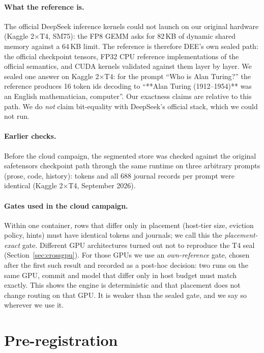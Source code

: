 \documentclass[11pt]{article}
\newcommand{\dee}{\textsc{DEE}}
\begin{document}
\paragraph{What the reference is.} The official DeepSeek inference kernels
could not launch on our original hardware (Kaggle 2$\times$T4, SM75): the FP8
GEMM asks for 82\,KB of dynamic shared memory against a 64\,KB limit. The
reference is therefore \dee{}'s own sealed path: the official checkpoint
tensors, FP32 CPU reference implementations of the official semantics, and CUDA
kernels validated against them layer by layer. We sealed one answer on Kaggle
2$\times$T4: for the prompt ``Who is Alan Turing?'' the reference produces 16
token ids decoding to ``**Alan Turing (1912--1954)** was an English
mathematician, computer''. Our exactness claims are relative to this path. We do
\emph{not} claim bit-equality with DeepSeek's official stack, which we could not
run.

\paragraph{Earlier checks.} Before the cloud campaign, the segmented store was
checked against the original safetensors checkpoint path through the same
runtime on three arbitrary prompts (prose, code, history): tokens and all 688
journal records per prompt were identical (Kaggle 2$\times$T4, September 2026).

\paragraph{Gates used in the cloud campaign.} Within one container, rows that
differ only in placement (host-tier size, eviction policy, hints) must have
identical tokens and journals; we call this the \emph{placement-exact} gate.
Different GPU architectures turned out not to reproduce the T4 seal
(Section~\ref{sec:crossgpu}). For those GPUs we use an
\emph{own-reference} gate, chosen after the first such result and recorded as
a post-hoc decision: two runs on the same GPU, commit and model that differ only
in host budget must match exactly. This shows the engine is deterministic and
that placement does not change routing on that GPU. It is weaker than the
sealed gate, and we say so wherever we use it.

\section{Pre-registration}\label{sec:prereg}
\end{document}
